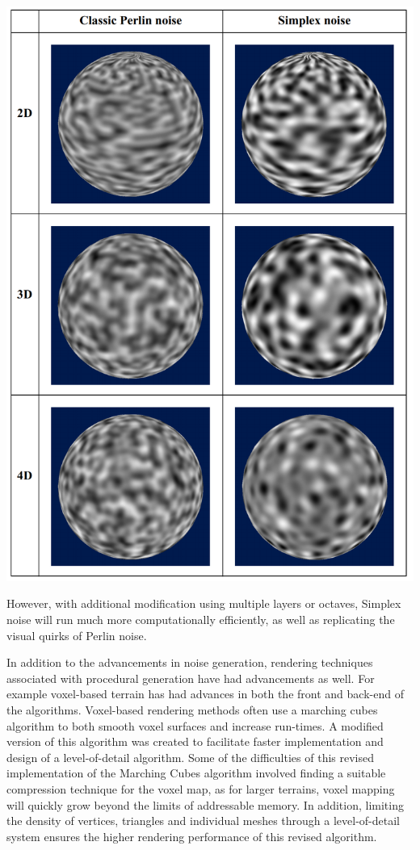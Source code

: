 \documentclass[10pt]{report}
\begin{document}
		\begin{minipage}{\textwidth}
			\centering
			\includegraphics[scale=.25]{perlin vs simplex}
			\label{fig:fig4}
		\end{minipage}
	
		However, with additional modification using multiple layers or octaves, Simplex noise will run much more computationally efficiently, as well as replicating the visual quirks of Perlin noise. 
		
		In addition to the advancements in noise generation, rendering techniques associated with procedural generation have had advancements as well. For example voxel-based terrain has had advances in both the front and back-end of the algorithms. Voxel-based rendering methods often use a marching cubes algorithm to both smooth voxel surfaces and increase run-times. A modified version of this algorithm was created to facilitate faster implementation and design of a level-of-detail algorithm. Some of the difficulties of this revised implementation of the Marching Cubes algorithm involved finding a suitable compression technique for the voxel map, as for larger terrains, voxel mapping will quickly grow beyond the limits of addressable memory. In addition, limiting the density of vertices, triangles and individual meshes through a level-of-detail system ensures the higher rendering performance of this revised algorithm. 
		
\end{document}
